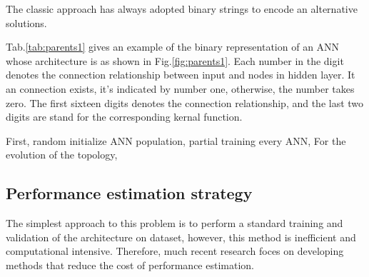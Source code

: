 The classic approach has always adopted binary strings to encode an alternative solutions. 

Tab.\ref{tab:parents1}  gives an example of the binary representation of an ANN
whose architecture is as shown in Fig.\ref{fig:parents1}. Each number in the
digit denotes the connection relationship between input and nodes in hidden
layer. It an connection exists, it's indicated by number one, otherwise, the
number takes zero. The first sixteen digits denotes the connection relationship, and the
last two digits are stand for  the corresponding kernal function. 

First,  random initialize ANN population, partial training every ANN, 
For the evolution of the topology,

\subsection{Performance estimation strategy}
The simplest approach to this problem is to perform a standard training and
validation of the architecture on dataset, however, this method is inefficient
and computational intensive. Therefore, much recent
research\cite{baker2017accelerating} foces on developing methods that reduce
the cost of performance estimation.




